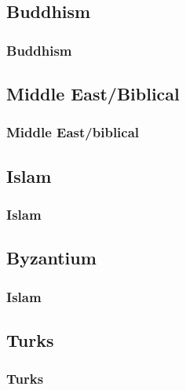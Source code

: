 \subsection{Buddhism}
\begin{frame}\frametitle{Buddhism}\logoEvolution

\end{frame}


\subsection{Middle East/Biblical}
\begin{frame}\frametitle{Middle East/biblical}\logoEvolution

\end{frame}


\subsection{Islam}
\begin{frame}\frametitle{Islam}\logoEvolution

\end{frame}

\subsection{Byzantium}
\begin{frame}\frametitle{Islam}\logoEvolution

\end{frame}


\subsection{Turks}
\begin{frame}\frametitle{Turks}\logoEvolution

\end{frame}

